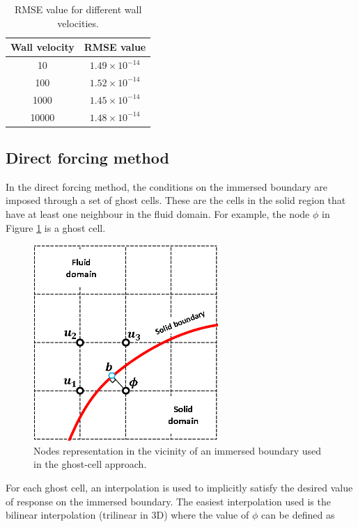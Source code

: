\begin{table}[H]
\centering
\begin{tabular}{c | c}
	 Wall velocity & RMSE value \\ \hline \hline
	 10 & $1.49 \times 10^{-14}$ \\ \hline
	 100 & $1.52 \times 10^{-14}$ \\ \hline
	 1000 & $1.45 \times 10^{-14}$ \\ \hline
	 10000 & $1.48 \times 10^{-14}$

\end{tabular}
\caption{RMSE value for different wall velocities.}
\label{table:C3_indirectForcing_wallVelocityRSME}
\end{table}

\subsection{Direct forcing method}
In the direct forcing method, the conditions on the immersed boundary are imposed through a set of ghost cells. These are the cells in the solid region that have at least one neighbour in the fluid domain. For example, the node $\phi$ in Figure \ref{fig:C3_ghostCell} is a ghost cell.

\begin{figure}[H]
	\centering
	\includegraphics[width=7.00cm]{Chapter_3/figure/discrete_forcing_approach.png}
	\caption{Nodes representation in the vicinity of an immersed boundary used in the ghost-cell approach.}
	\label{fig:C3_ghostCell}
\end{figure}

For each ghost cell, an interpolation is used to implicitly satisfy the desired value of response on the immersed boundary. The easiest interpolation used is the bilinear interpolation (trilinear in 3D) where the value of $\phi$ can be defined as

